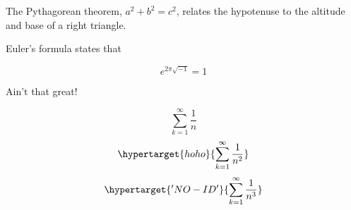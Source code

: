 The Pythagorean theorem, $a^2 + b^2 = c^2$,
relates the hypotenuse to the altitude
and base of a right triangle.


Euler’s formula states that

\[
  e^{2\pi \sqrt{-1}} = 1
\]




Ain’t that great!


\begin{equation*}
\sum_{k=1}^\infty \frac{1}{n}
\end{equation*}
\begin{equation}
\label{hoho}
\hypertarget{hoho}{\sum_{k=1}^\infty \frac{1}{n^2}}
\end{equation}
\begin{equation}
\hypertarget{'NO-ID'}{\sum_{k=1}^\infty \frac{1}{n^3}}
\end{equation}
